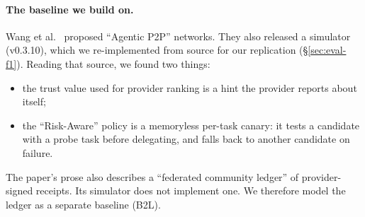 \paragraph{The baseline we build on.}
Wang et al.~\cite{wang2026agenticp2p} proposed ``Agentic P2P'' networks.
They also released a simulator (v0.3.10), which we re-implemented from
source for our replication (\S\ref{sec:eval-f1}). Reading that source, we
found two things:
\begin{itemize}
\item the trust value used for provider ranking is a hint the provider
  reports about itself;
\item the ``Risk-Aware'' policy is a memoryless per-task canary: it tests
  a candidate with a probe task before delegating, and falls back to
  another candidate on failure.
\end{itemize}
The paper's prose also describes a ``federated community ledger'' of
provider-signed receipts. Its simulator does not implement one. We
therefore model the ledger as a separate baseline (B2L).
